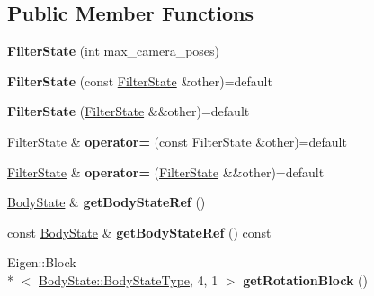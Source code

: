 \subsection*{Public Member Functions}
\begin{DoxyCompactItemize}
\item 
\hypertarget{class_filter_state_a96a6a62727b41b89cd1020fccde8bf51}{{\bfseries Filter\-State} (int max\-\_\-camera\-\_\-poses)}\label{class_filter_state_a96a6a62727b41b89cd1020fccde8bf51}

\item 
\hypertarget{class_filter_state_a787e83cc2d2a29b1a63e6a563c68ec64}{{\bfseries Filter\-State} (const \hyperlink{class_filter_state}{Filter\-State} \&other)=default}\label{class_filter_state_a787e83cc2d2a29b1a63e6a563c68ec64}

\item 
\hypertarget{class_filter_state_a276c5ef3144894bbbb875104d229ee33}{{\bfseries Filter\-State} (\hyperlink{class_filter_state}{Filter\-State} \&\&other)=default}\label{class_filter_state_a276c5ef3144894bbbb875104d229ee33}

\item 
\hypertarget{class_filter_state_a3559980125f96c1498b6047f97a59498}{\hyperlink{class_filter_state}{Filter\-State} \& {\bfseries operator=} (const \hyperlink{class_filter_state}{Filter\-State} \&other)=default}\label{class_filter_state_a3559980125f96c1498b6047f97a59498}

\item 
\hypertarget{class_filter_state_a979c282e7e50b6549679bca9ffa4b474}{\hyperlink{class_filter_state}{Filter\-State} \& {\bfseries operator=} (\hyperlink{class_filter_state}{Filter\-State} \&\&other)=default}\label{class_filter_state_a979c282e7e50b6549679bca9ffa4b474}

\item 
\hypertarget{class_filter_state_a931d62079a89ceacc6e3f62cad16fe77}{\hyperlink{class_body_state}{Body\-State} \& {\bfseries get\-Body\-State\-Ref} ()}\label{class_filter_state_a931d62079a89ceacc6e3f62cad16fe77}

\item 
\hypertarget{class_filter_state_af7a4b70d8985b4552f4ed8e5d36409e3}{const \hyperlink{class_body_state}{Body\-State} \& {\bfseries get\-Body\-State\-Ref} () const }\label{class_filter_state_af7a4b70d8985b4552f4ed8e5d36409e3}

\item 
\hypertarget{class_filter_state_a0fb9693aac0a091bbcc1555b44902570}{Eigen\-::\-Block\\*
$<$ \hyperlink{class_body_state_ac95355c4974335a6f69da770d2de30e0}{Body\-State\-::\-Body\-State\-Type}, 4, 1 $>$ {\bfseries get\-Rotation\-Block} ()}\label{class_filter_state_a0fb9693aac0a091bbcc1555b44902570}


\end{DoxyCompactItemize}
